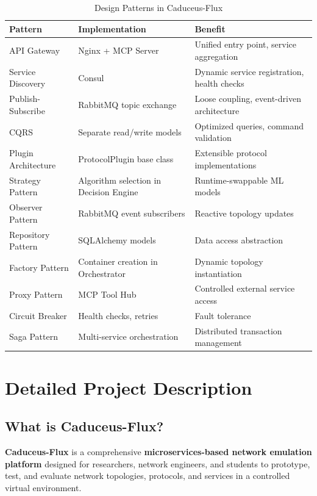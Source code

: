 \documentclass[10pt,a4paper]{article}
\begin{document}
\begin{table}[htbp]
\centering
\caption{Design Patterns in Caduceus-Flux}
\begin{tabularx}{\textwidth}{lXX}
\toprule
\textbf{Pattern} & \textbf{Implementation} & \textbf{Benefit} \\
\midrule
API Gateway & Nginx + MCP Server & Unified entry point, service aggregation \\
Service Discovery & Consul & Dynamic service registration, health checks \\
Publish-Subscribe & RabbitMQ topic exchange & Loose coupling, event-driven architecture \\
CQRS & Separate read/write models & Optimized queries, command validation \\
Plugin Architecture & ProtocolPlugin base class & Extensible protocol implementations \\
Strategy Pattern & Algorithm selection in Decision Engine & Runtime-swappable ML models \\
Observer Pattern & RabbitMQ event subscribers & Reactive topology updates \\
Repository Pattern & SQLAlchemy models & Data access abstraction \\
Factory Pattern & Container creation in Orchestrator & Dynamic topology instantiation \\
Proxy Pattern & MCP Tool Hub & Controlled external service access \\
Circuit Breaker & Health checks, retries & Fault tolerance \\
Saga Pattern & Multi-service orchestration & Distributed transaction management \\
\bottomrule
\end{tabularx}
\end{table}

\section{Detailed Project Description}

\subsection{What is Caduceus-Flux?}

\textbf{Caduceus-Flux} is a comprehensive \textbf{microservices-based network emulation platform} designed for researchers, network engineers, and students to prototype, test, and evaluate network topologies, protocols, and services in a controlled virtual environment.
\end{document}
